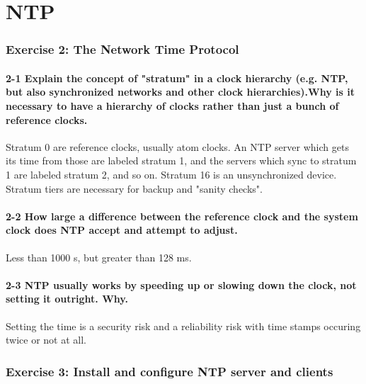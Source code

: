 
\chapter{NTP}
\subsection{Exercise 2: The Network Time Protocol}
\subsubsection{2-1 Explain the concept of "stratum" in a clock hierarchy (e.g. NTP, but also synchronized networks and other clock hierarchies).Why is it necessary to have a hierarchy of clocks rather than just a bunch of reference clocks.}
Stratum 0 are reference clocks, usually atom clocks. An NTP server which gets its time from those are labeled stratum 1, and the servers which sync to stratum 1 are labeled stratum 2, and so on. Stratum 16 is an unsynchronized device.
Stratum tiers are necessary for backup and "sanity checks".

\subsubsection{2-2 How large a difference between the reference clock and the system clock does NTP accept and attempt to adjust.}
Less than 1000 s, but greater than 128 ms.

\subsubsection{2-3 NTP usually works by speeding up or slowing down the clock, not setting it outright. Why.}
Setting the time is a security risk and a reliability risk with time stamps occuring twice or not at all.

\subsection{Exercise 3: Install and configure NTP server and clients}
